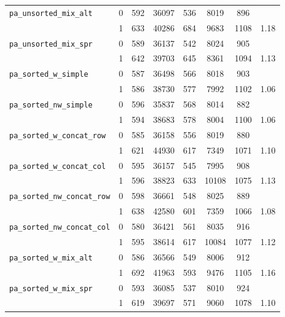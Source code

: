 \begin{table}[h]
\begin{tabular}{|l|c||c|c|c|c|c||c|}
		\verb|pa_unsorted_mix_alt| & 0 & 592 & 36097 & 536 & 8019 & 896 & \\ %
		& 1 &  633 & 40286 & 684 & 9683 & 1108 & 1.18 \\ \hline %
		
		\verb|pa_unsorted_mix_spr| & 0 & 589 & 36137 & 542 & 8024 & 905 & \\ %
		& 1 &  642 & 39703 & 645 & 8361 & 1094 & 1.13 \\ \hline %
		
		\verb|pa_sorted_w_simple| & 0 & 587 & 36498 & 566 & 8018 & 903 & \\ %
		& 1 &  586 & 38730 & 577 & 7992 & 1102 & 1.06 \\ \hline %
		
		\verb|pa_sorted_nw_simple| & 0 & 596 & 35837 & 568 & 8014 & 882 & \\ %
		& 1 &  594 & 38683 & 578 & 8004 & 1100 & 1.06 \\ \hline %
		
		\verb|pa_sorted_w_concat_row| & 0 & 585 & 36158 & 556 & 8019 & 880 & \\ %
		& 1 &  621 & 44930 & 617 & 7349 & 1071& 1.10 \\ \hline %
		
		\verb|pa_sorted_w_concat_col| & 0 & 595 & 36157 & 545 & 7995 & 908 &  \\ %
		& 1 &  596 & 38823 & 633 & 10108 & 1075 & 1.13 \\ \hline %
		
		\verb|pa_sorted_nw_concat_row| & 0 & 598 & 36661 & 548 & 8025 & 889 & \\ %
		& 1 & 638 & 42580 & 601 & 7359 & 1066 & 1.08 \\ \hline %
		
		\verb|pa_sorted_nw_concat_col| & 0 & 580 & 36421 & 561 & 8035 & 916 & \\ %
		& 1 & 595 & 38614 & 617 &  10084  & 1077 & 1.12 \\ \hline %
		
		\verb|pa_sorted_w_mix_alt| & 0 &  586 & 36566 & 549 & 8006  & 912 & \\ %
		& 1 & 692 & 41963 & 593 & 9476 & 1105 & 1.16 \\ \hline %
		
		\verb|pa_sorted_w_mix_spr| & 0 &  593 & 36085 &  537 & 8010 & 924 & \\ %
		& 1 & 619 & 39697 & 571 &  9060 & 1078 & 1.10 \\ \hline %
		

\end{tabular}
\end{table}
